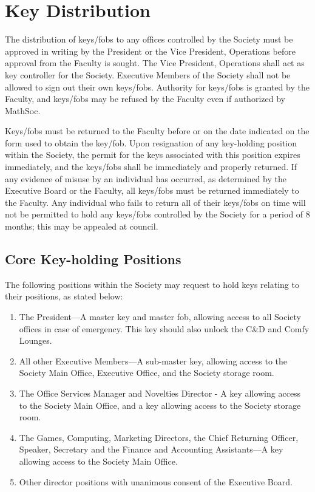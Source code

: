 \section{Key Distribution}
The distribution of keys/fobs to any offices controlled by the Society must be
approved in writing by the President or the Vice President, Operations before
approval from the Faculty is sought. The Vice President, Operations shall act
as key controller for the Society. Executive Members of the Society shall not
be allowed to sign out their own keys/fobs. Authority for keys/fobs is granted
by the Faculty, and keys/fobs may be refused by the Faculty even if authorized
by MathSoc.

Keys/fobs must be returned to the Faculty before or on the date indicated on
the form used to obtain the key/fob. Upon resignation of any key-holding
position within the Society, the permit for the keys associated with this
position expires immediately, and the keys/fobs shall be immediately and
properly returned. If any evidence of misuse by an individual has occurred, as
determined by the Executive Board or the Faculty, all keys/fobs must be
returned immediately to the Faculty. Any individual who fails to return all of
their keys/fobs on time will not be permitted to hold any keys/fobs controlled
by the Society for a period of 8 months; this may be appealed at council.

\subsection{Core Key-holding Positions}
The following positions within the Society may request to hold keys relating to
their positions, as stated below:
\begin{enumerate}
  \item The President---A master key and master fob, allowing access to all
    Society offices in case of emergency. This key should also unlock the C\&D
    and Comfy Lounges.
  \item All other Executive Members---A sub-master key, allowing access to the
    Society Main Office, Executive Office, and the Society storage room.
  \item The Office Services Manager and Novelties Director - A key allowing
    access to the Society Main Office, and a key allowing access to the Society
    storage room.
  \item The Games, Computing, Marketing Directors, the Chief Returning Officer,
    Speaker, Secretary and the Finance and Accounting Assistants---A key
    allowing access to the Society Main Office.
  \item Other director positions with unanimous consent of the Executive Board.
\end{enumerate}


